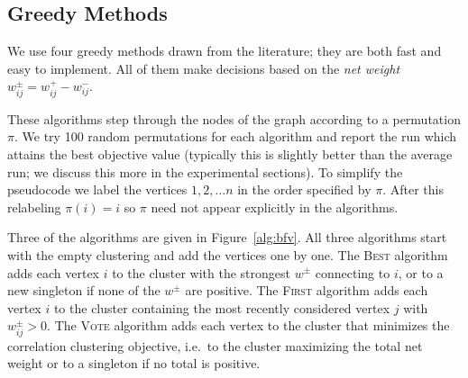 \documentclass[11pt]{article}
\newcommand{\commentw}[1]{{\bf WS: #1}}
\begin{document}


\subsection{Greedy Methods}

We use four greedy methods drawn from the literature; they are both
fast and easy to implement.  All of them make decisions based on the
\emph{net weight} $w^{\pm}_{ij} = w^+_{ij} - w^{-}_{ij}$.

These algorithms step through the nodes of the graph according to a
permutation $\pi$. We try 100 random permutations for each algorithm
and report the run which attains the best objective value (typically
this is slightly better than the average run; we discuss this more in
the experimental sections). To simplify the pseudocode we label the
vertices $1,2,\ldots n$ in the order specified by $\pi$. After this
relabeling $\pi(i) = i$ so $\pi$ need not appear explicitly in the
algorithms.

Three of the algorithms are given in Figure~\ref{alg:bfv}. All three
algorithms start with the empty clustering and add the vertices one by
one. The \textsc{Best} algorithm adds each vertex $i$ to the
cluster with the strongest $w^\pm$ connecting to $i$, or to a new
singleton if none of the $w^\pm$ are positive. The \textsc{First}
algorithm adds each vertex $i$ to the cluster containing
the most recently considered vertex $j$ with $w^\pm_{ij} > 0$. The
\textsc{Vote} algorithm adds each vertex to the cluster that minimizes
the correlation clustering objective, i.e.\ to the cluster maximizing
the total net weight or to a singleton if no total is positive.
\end{document}
